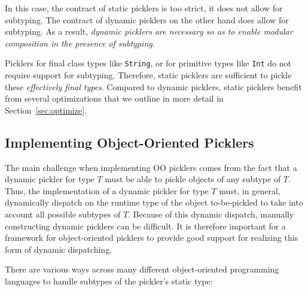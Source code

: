 \documentclass[preprint,10pt]{sigplanconf}
\theoremstyle{definition}
\newcommand{\term}[1]{\mbox{\texttt{#1}}}
\begin{document}
In this case, the contract of static picklers is too strict, it does not allow
for subtyping. The contract of dynamic picklers on the other hand does allow
for subtyping. As a result, {\em dynamic picklers are necessary so as to enable
modular composition in the presence of subtyping}.

Picklers for final class types like \term{String}, or for primitive types like
\term{Int} do not require support for subtyping. Therefore, static picklers
are sufficient to pickle these {\em effectively final types}. Compared to
dynamic picklers, static picklers benefit from several optimizations that we
outline in more detail in Section~\ref{sec:optimize}.

\subsection{Implementing Object-Oriented Picklers}

The main challenge when implementing OO picklers comes from the fact that a
dynamic pickler for type $T$ must be able to pickle objects of any subtype of
$T$. Thus, the implementation of a dynamic pickler for type $T$ must, in
general, dynamically dispatch on the runtime type of the object to-be-pickled
to take into account all possible subtypes of $T$. Because of this dynamic
dispatch, manually constructing dynamic picklers can be difficult. It is
therefore important for a framework for object-oriented picklers to provide
good support for realizing this form of dynamic dispatching.

There are various ways across many different object-oriented programming
languages to handle subtypes of the pickler's static type:
\end{document}
